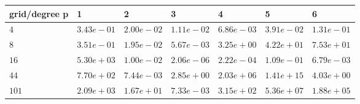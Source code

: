 \begin{tabular}{lllllll}
\hline
 grid/degree p   & 1          & 2          & 3          & 4          & 5          & 6          \\
\hline
 $4$             & $3.43e-01$ & $2.00e-02$ & $1.11e-02$ & $6.86e-03$ & $3.91e-02$ & $1.31e-01$ \\
 $8$             & $3.51e-01$ & $1.95e-02$ & $5.67e-03$ & $3.25e+00$ & $4.22e+01$ & $7.53e+01$ \\
 $16$            & $5.30e+03$ & $1.00e-02$ & $2.06e-06$ & $2.22e-04$ & $1.09e-01$ & $6.79e-03$ \\
 $44$            & $7.70e+02$ & $7.44e-03$ & $2.85e+00$ & $2.03e+06$ & $1.41e+15$ & $4.03e+00$ \\
 $101$           & $2.09e+03$ & $1.67e+01$ & $7.33e-03$ & $3.15e+02$ & $5.36e+07$ & $1.88e+05$ \\
\hline
\end{tabular}
